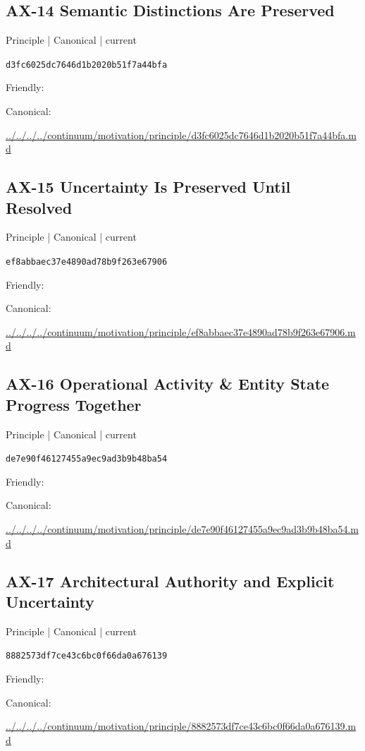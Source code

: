 \documentclass[10pt,a4paper]{article}
\begin{document}
\subsection*{AX-14 Semantic Distinctions Are Preserved}
{\small Principle | Canonical | current}\par
\texttt{d3fc6025dc7646d1b2020b51f7a44bfa}\par
Friendly: \par
Canonical: \par
{\footnotesize\url{../../../../continuum/motivation/principle/d3fc6025dc7646d1b2020b51f7a44bfa.md}}\par
\subsection*{AX-15 Uncertainty Is Preserved Until Resolved}
{\small Principle | Canonical | current}\par
\texttt{ef8abbaec37e4890ad78b9f263e67906}\par
Friendly: \par
Canonical: \par
{\footnotesize\url{../../../../continuum/motivation/principle/ef8abbaec37e4890ad78b9f263e67906.md}}\par
\subsection*{AX-16 Operational Activity \& Entity State Progress Together}
{\small Principle | Canonical | current}\par
\texttt{de7e90f46127455a9ec9ad3b9b48ba54}\par
Friendly: \par
Canonical: \par
{\footnotesize\url{../../../../continuum/motivation/principle/de7e90f46127455a9ec9ad3b9b48ba54.md}}\par
\subsection*{AX-17 Architectural Authority and Explicit Uncertainty}
{\small Principle | Canonical | current}\par
\texttt{8882573df7ce43c6bc0f66da0a676139}\par
Friendly: \par
Canonical: \par
{\footnotesize\url{../../../../continuum/motivation/principle/8882573df7ce43c6bc0f66da0a676139.md}}\par
\end{document}
